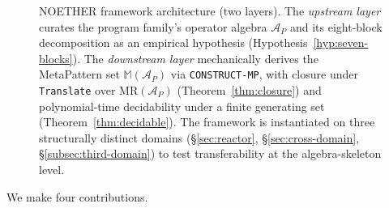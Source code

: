 \documentclass[acmsmall, screen]{acmart}
\begin{document}
\begin{figure}[h]
\caption{NOETHER framework architecture (two layers). The
\emph{upstream layer} curates the program family's operator algebra
$\mathcal{A}_P$ and its eight-block decomposition as an empirical
hypothesis (Hypothesis~\ref{hyp:seven-blocks}). The \emph{downstream
layer} mechanically derives the MetaPattern set
$\mathbb{M}(\mathcal{A}_P)$ via \texttt{CONSTRUCT-MP}, with closure
under \texttt{Translate} over $\mathrm{MR}(\mathcal{A}_P)$
(Theorem~\ref{thm:closure}) and polynomial-time decidability under a
finite generating set (Theorem~\ref{thm:decidable}). The framework
is instantiated on three structurally distinct domains
(\S\ref{sec:reactor}, \S\ref{sec:cross-domain}, \S\ref{subsec:third-domain})
to test transferability at the algebra-skeleton level.}
\label{fig:noether-arch}
\end{figure}

We make four contributions.
\end{document}
